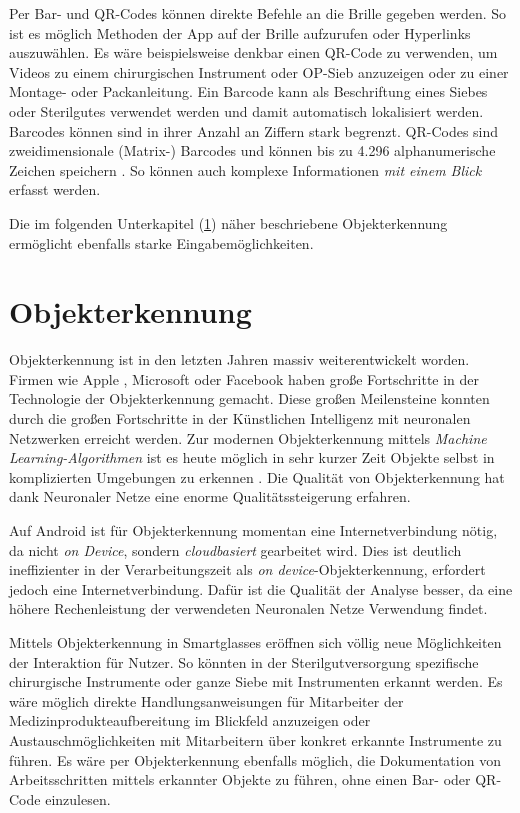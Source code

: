 Per Bar- und QR-Codes können direkte Befehle an die Brille gegeben werden. So ist es möglich Methoden der App auf der Brille aufzurufen oder Hyperlinks auszuwählen. Es wäre beispielsweise denkbar einen QR-Code zu verwenden, um Videos zu einem chirurgischen Instrument oder OP-Sieb anzuzeigen oder zu einer Montage- oder Packanleitung. Ein Barcode kann als Beschriftung eines Siebes oder Sterilgutes verwendet werden und damit automatisch lokalisiert werden. Barcodes können sind in ihrer Anzahl an Ziffern stark begrenzt.
%
QR-Codes sind zweidimensionale (Matrix-) Barcodes und können bis zu 4.296 alphanumerische Zeichen speichern \cite{INCORPORATED2018}. So können auch komplexe Informationen \emph{mit einem Blick} erfasst werden.

Die im folgenden Unterkapitel (\ref{sec:Objekterkennung}) näher beschriebene Objekterkennung ermöglicht ebenfalls starke Eingabemöglichkeiten.
%
%
%
%
%
%
\section{Objekterkennung}
\label{sec:Objekterkennung}
Objekterkennung ist in den letzten Jahren massiv weiterentwickelt worden. Firmen wie Apple \cite{Apple2018b}, Microsoft \cite{Girshick2015} oder Facebook \cite{Schroepfer2015} haben große Fortschritte in der Technologie der Objekterkennung gemacht. Diese großen Meilensteine konnten durch die großen Fortschritte in der Künstlichen Intelligenz mit neuronalen Netzwerken \cite{Apple2018b, Schroepfer2015} erreicht werden. Zur modernen Objekterkennung mittels \emph{Machine Learning-Algorithmen} ist es heute möglich in sehr kurzer Zeit Objekte selbst in komplizierten Umgebungen zu erkennen \cite{Schroepfer2015}. 
Die Qualität von Objekterkennung hat dank Neuronaler Netze eine enorme Qualitätssteigerung erfahren.

Auf Android ist für Objekterkennung momentan eine Internetverbindung nötig, da nicht \emph{on Device}, sondern \emph{cloudbasiert} gearbeitet wird. Dies ist deutlich ineffizienter in der Verarbeitungszeit als \emph{on device}-Objekterkennung, erfordert jedoch eine Internetverbindung. Dafür ist die Qualität der Analyse besser, da eine höhere Rechenleistung der verwendeten Neuronalen Netze Verwendung findet.

Mittels Objekterkennung in Smartglasses eröffnen sich völlig neue Möglichkeiten der Interaktion für Nutzer. So könnten in der Sterilgutversorgung spezifische chirurgische Instrumente oder ganze Siebe mit Instrumenten erkannt werden. Es wäre möglich direkte Handlungsanweisungen für Mitarbeiter der Medizinprodukteaufbereitung im Blickfeld anzuzeigen oder Austauschmöglichkeiten mit Mitarbeitern über konkret erkannte Instrumente zu führen. Es wäre per Objekterkennung ebenfalls möglich, die Dokumentation von Arbeitsschritten mittels erkannter Objekte zu führen, ohne einen Bar- oder QR-Code einzulesen.
%
%
%
%
%
%
